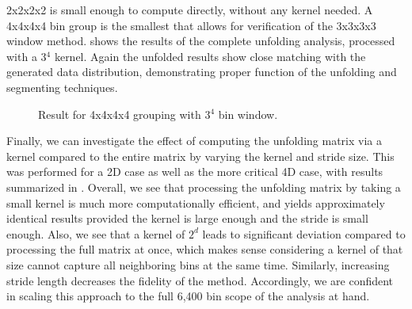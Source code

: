         2x2x2x2 is small enough to compute directly, without any kernel needed. A 4x4x4x4 bin group is the smallest that allows for verification of the 3x3x3x3 window method.  shows the results of the complete unfolding analysis, processed with a 3$^4$ kernel. Again the unfolded results show close matching with the generated data distribution, demonstrating proper function of the unfolding and segmenting techniques.
    
        \begin{figure}[H]
            \centering
            \hfill
            \caption[4x4x4x4 IBU Result]{ Result for 4x4x4x4 grouping with 3$^4$ bin window.}\label{fig:4x4unfold}
        \end{figure}

        Finally, we can investigate the effect of computing the unfolding matrix via a kernel compared to the entire matrix by varying the kernel and stride size. This was performed for a 2D case as well as the more critical 4D case, with results summarized in . Overall, we see that processing the unfolding matrix by taking a small kernel is much more computationally efficient, and yields approximately identical results provided the kernel is large enough and the stride is small enough. Also, we see that a kernel of $2^d$ leads to significant deviation compared to processing the full matrix at once, which makes sense considering a kernel of that size cannot capture all neighboring bins at the same time. Similarly, increasing stride length decreases the fidelity of the method. Accordingly, we are confident in scaling this approach to the full 6,400 bin scope of the analysis at hand. 
    
